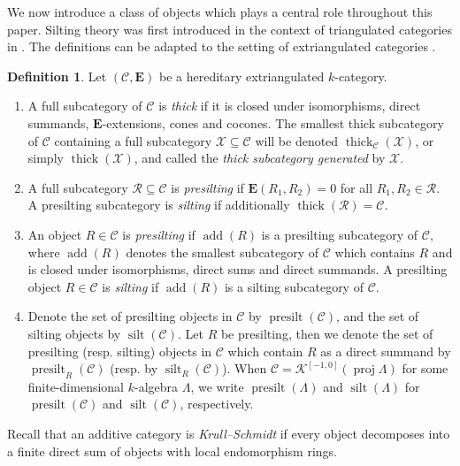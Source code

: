 \documentclass[10pt,twoside, a4paper,reqno]{amsart}
\DeclareMathOperator{\silt}{silt}
\DeclareMathOperator{\presilt}{presilt}
\DeclareMathOperator{\add}{add}
\DeclareMathOperator{\thick}{thick}
\DeclareMathOperator{\proj}{proj}
\newcommand{\Ktwo}{\mathcal{K}^{[-1,0]}}
\newcommand{\calC}{\mathcal{C}}
\newcommand{\E}{\mathbf{E}}
\theoremstyle{definition}
\newtheorem{definition}[theorem]{Definition}
\begin{document}
We now introduce a class of objects which plays a central role throughout this paper. Silting theory was first introduced in the context of triangulated categories in \cite{KV88}. The definitions can be adapted to the setting of extriangulated categories \cite{AT22,AT23,GNP23}.

\begin{definition}
    Let $(\calC,\E)$ be a hereditary extriangulated $k$-category.
    \begin{enumerate}
    \item A full subcategory of $\calC$ is \textit{thick} if it is closed under isomorphisms, direct summands, {$\E$-}extensions, cones and cocones. The smallest thick subcategory of $\calC$ containing a full subcategory $\mathcal{X}\subseteq \calC$ will be denoted $\thick_{\calC}(\mathcal{X})$, or simply $\thick(\mathcal{X})${, and called the \textit{thick subcategory generated}} by $\mathcal{X}$. 
    \item A full subcategory $\mathcal{R}\subseteq \calC$ is \textit{presilting} if $\E(R_1,R_2)=0$ for all $R_1,R_2\in \mathcal{R}$. A presilting subcategory is \textit{silting} if additionally $\thick(\mathcal{R})=\calC$.
        \item An object $R\in \calC$ is \textit{presilting} {if} $\add(R)$ is a presilting subcategory of $\calC$, where $\add(R)$ denotes the smallest subcategory of $\calC$ which contains $R$ and is closed under isomorphisms, direct sums and direct summands. A presilting object $R\in \calC$ {is} \textit{silting} {if} $\add(R)$ is a silting subcategory of $\calC$.
    \item Denote the set of presilting {objects} in $\calC$ by $\presilt(\calC)$, and the set of silting {objects} by $\silt(\calC)$. {Let {$R$} be presilting, then we denote the set of presilting (resp. silting) {objects} in $\calC$ which contain {$R$ as a direct summand} by $\presilt_{{R}}(\calC)$ (resp. by $\silt_{R}(\calC)$).} When $\calC=\Ktwo(\proj \Lambda)$ for some finite-dimensional $k$-algebra $\Lambda$, we write $\presilt(\Lambda)$ and $\silt(\Lambda)$ for $\presilt(\calC)$ and $\silt(\calC)$, respectively.
    \end{enumerate}
\end{definition}

Recall that an additive category is \textit{Krull--Schmidt} if every object decomposes into a finite direct sum of objects with local endomorphism rings. 
\end{document}
